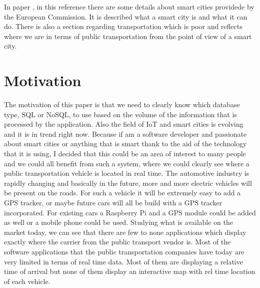 \tab In paper \cite{smart-cities-details-fom-eu}, in this reference there are some details about smart cities providede by the European Commission. It is described what a smart city is and what it can do. There is also a section regarding transportation which is poor and reflects where we are in terms of public transportation from the point of view of a smart city.
\newline
\newpage
\section{Motivation}
\tab The motivation of this paper is that we need to clearly know which database type, SQL or NoSQL, to use based on the volume of the information that is processed by the application. Also the field of IoT and smart cities is evolving and it is in trend right now. 
\newline
\tab Because if am a software developer and passionate about smart cities or anything that is smart thank to the aid of the technology that it is using, I decided that this could be an area of interest to many people and we could all benefit from such a system, where we could clearly see where a public transportation vehicle is located in real time. 
\newline
\tab The automotive industry is rapidly changing and basically in the future, more and more electric vehicles will be present on the roads. For such a vehicle it will be extremely easy to add a GPS tracker, or maybe future cars will all be build with a GPS tracker incorporated. For existing cars a Raspberry Pi and a GPS module could be added as well or a mobile phone could be used.
\newline
\tab Studying what is available on the market today, we can see that there are few to none applications which display exactly where the carrier from the public transport vendor is. Most of the software applications that the public transportation companies have today are very limited in terms of real time data. Most of them are displaying a relative time of arrival but none of them display an interactive map with rel time location of each vehicle.